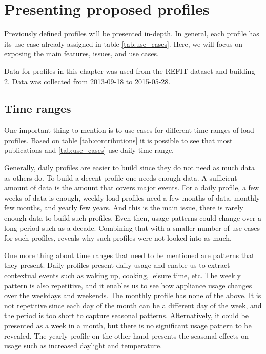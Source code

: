\label{chapter6}
\chapter{Presenting proposed profiles}

Previously defined profiles will be presented in-depth. 
In general, each profile has its use case already assigned in table \ref{tab:use_cases}.
Here, we will focus on exposing the main features, issues, and use cases. 

Data for profiles in this chapter was used from the REFIT dataset and building 2.
Data was collected from 2013-09-18 to 2015-05-28.

\section{Time ranges}
One important thing to mention is to use cases for different time ranges of load profiles.
Based on table \ref{tab:contributions} it is possible to see that most publications and \ref{tab:use_cases} use daily time range.

Generally, daily profiles are easier to build since they do not need as much data as others do.
To build a decent profile one needs enough data. 
A sufficient amount of data is the amount that covers major events.
For a daily profile, a few weeks of data is enough, weekly load profiles need a few months of data, monthly few months, and yearly few years.
And this is the main issue, there is rarely enough data to build such profiles.
Even then, usage patterns could change over a long period such as a decade.
Combining that with a smaller number of use cases for such profiles, reveals why such profiles were not looked into as much.

One more thing about time ranges that need to be mentioned are patterns that they present.
Daily profiles present daily usage and enable us to extract contextual events such as waking up, cooking, leisure time, etc.
The weekly pattern is also repetitive, and it enables us to see how appliance usage changes over the weekdays and weekends.
The monthly profile has none of the above. It is not repetitive since each day of the month can be a different day of the week, and the period is too short to capture seasonal patterns.
Alternatively, it could be presented as a week in a month, but there is no significant usage pattern to be revealed.
The yearly profile on the other hand presents the seasonal effects on usage such as increased daylight and temperature. 



